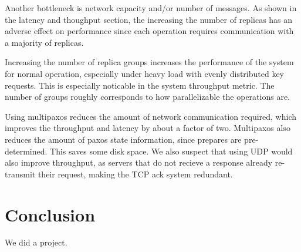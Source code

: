\documentclass[letterpaper,10pt]{article}
\begin{document}
Another bottleneck is network capacity and/or number of messages. As
shown in the latency and thoughput section, the increasing the number
of replicas has an adverse effect on performance since each operation
requires communication with a majority of replicas. 

Increasing the number of replica groups increases the performance of
the system for normal operation, especially under heavy load with
evenly distributed key requests. This is especially noticable in the
system throughput metric.  The number of groups roughly corresponds to
how parallelizable the operations are.

Using multipaxos reduces the amount of network communication required,
which improves the throughput and latency by about a factor of
two. Multipaxos also reduces the amount of paxos state information,
since prepares are pre-determined. This saves some disk space.  We
also suspect that using UDP would also improve throughput, as servers
that do not recieve a response already re-transmit their request,
making the TCP ack system redundant.

\section{Conclusion}
We did a project.

\end{document}
